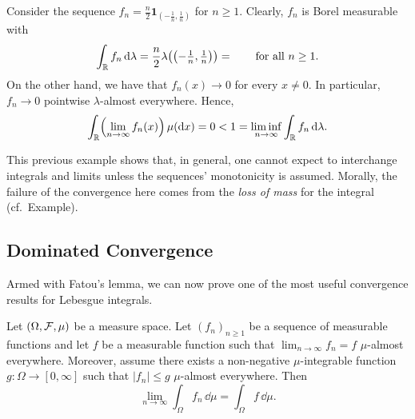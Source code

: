 \begin{example}\label{ex:Fatou}
	Consider the sequence $f_n = \frac{n}{2}\mathbf{1}_{(-\frac{1}{n},\frac{1}{n})}$ for $n\ge 1$. Clearly, $f_n$ is Borel measurable with
	\[
		\int_{\mathbb R} f_n\,\mathrm{d}\lambda = \frac{n}{2}\lambda\bigl(\bigl(-\tfrac{1}{n},\tfrac{1}{n}\bigr)\bigr) = \qquad\text{for all $n\ge 1$}.
	\]
	On the other hand, we have that $f_n(x)\to 0$ for every $x\ne 0$. In particular, $f_n\to 0$ pointwise $\lambda$-almost everywhere. Hence,
	\[
		\int_{\mathbb R} \Bigl(\lim_{n\to\infty} f_n(x)\Bigr)\,\mu(\mathrm{d} x) = 0 < 1 = \liminf_{n\to\infty} \int_{\mathbb R} f_n\,\mathrm{d}\lambda.
	\]
\end{example}

This previous example shows that, in general, one cannot expect to interchange integrals and limits unless the sequences' monotonicity is assumed. Morally, the failure of the convergence here comes from the \emph{loss of mass} for the integral (cf.\ Example).

\subsection{Dominated Convergence}

Armed with Fatou's lemma, we can now prove one of the most useful convergence results for Lebesgue integrals.

\begin{theorem}\label{thm:dominated_convergence}
Let $(\Omega, \mathcal F, \mu)$ be a measure space. Let $(f_n)_{n \ge 1}$ be a sequence of measurable functions and let $f$ be a measurable function such that $\lim_{n\to\infty}f_n = f$ $\mu$-almost everywhere. Moreover, assume there exists a non-negative $\mu$-integrable function $g : \Omega \to [0,\infty]$ such that $|f_n| \le g$ $\mu$-almost everywhere. Then
\[
	\lim_{n \to \infty} \int_\Omega f_n \,\dd \mu = \int_\Omega f \,\dd \mu.
\]
\end{theorem}

